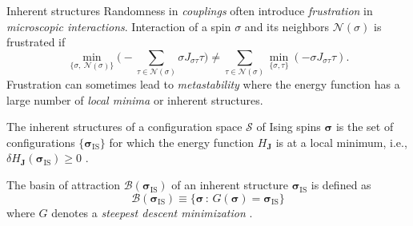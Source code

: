 \documentclass[8pt]{beamer}
\begin{document}
\begin{frame}[label={sec:org0280aaf}]{Inherent structures}
Randomness in \emph{couplings} often introduce \emph{frustration} in \emph{microscopic interactions}. Interaction of a spin \(\sigma\) and its neighbors \(\mathcal{N}(\sigma)\) is frustrated if
\begin{equation*}
\min_{\{\sigma, ~ \mathcal{N}(\sigma)\}} \bigg(- \sum_{\tau \in \mathcal{N} (\sigma)} \sigma J_{\sigma \tau} \tau \bigg) \neq \sum_{\tau \in \mathcal{N} (\sigma)} \min_{\{\sigma, \tau\}} (- \sigma J_{\sigma \tau} \tau).
\end{equation*}
Frustration can sometimes lead to \emph{metastability} where the energy function has a large number of \emph{local minima} or inherent structures.
\begin{definition}
\item The \alert{inherent structures} of a configuration space \(\mathcal{S}\) of Ising spins \(\boldsymbol{\sigma}\) is the set of configurations \(\{ \boldsymbol{\sigma}_{\text{IS}} \}\) for which the energy function \(H_{\boldsymbol{J}}\) is at a local minimum, i.e., \(\delta H_{\boldsymbol{J}} (\boldsymbol{\sigma}_{\mathrm{IS}}) \geq 0\) \cite{Stillinger1983InherentSI}.
\hfill \blacksquare
\end{definition}
\begin{definition}
\item The \alert{basin of attraction} \(\mathcal{B}(\boldsymbol{\sigma}_{\text{IS}})\) of an inherent structure \(\boldsymbol{\sigma}_{\text{IS}}\) is defined as
\[
\mathcal{B} (\boldsymbol{\sigma}_{\text{IS}}) \equiv \{ \boldsymbol{\sigma}\,:\, G(\boldsymbol{\sigma}) = \boldsymbol{\sigma}_{\text{IS}}  \}
\]
where \(G\) denotes a \emph{steepest descent minimization} \cite{schnabel2017dynamic}.
\hfill \blacksquare
\end{definition}

\end{frame}
\end{document}
